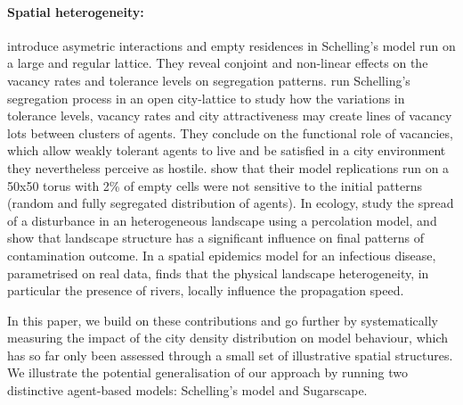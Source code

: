 \documentclass[3p,times,procedia]{elsarticle}
\begin{document}

\paragraph{Spatial heterogeneity:} \citet{StaufferSolomon2007} introduce asymetric interactions and empty residences in Schelling's model run on a large and regular lattice. They reveal conjoint and non-linear effects on the vacancy rates and tolerance levels on segregation patterns. \citet{Gauvinetal2010} run Schelling's segregation process in an open city-lattice to study how the variations in tolerance levels, vacancy rates and city attractiveness may create lines of vacancy lots between clusters of agents. They conclude on the functional role of vacancies, which allow weakly tolerant agents to live and be satisfied in a city environment they nevertheless perceive as hostile. \citet{HatnaBenenson2012} show that their model replications run on a 50x50 torus with 2\% of empty cells were not sensitive to the initial patterns (random and fully segregated distribution of agents). In ecology, \citet{smith2002predicting} study the spread of a disturbance in an heterogeneous landscape using a percolation model, and show that landscape structure has a significant influence on final patterns of contamination outcome. In a spatial epidemics model for an infectious disease, parametrised on real data, \citet{smith2002predicting} finds that the physical landscape heterogeneity, in particular the presence of rivers, locally influence the propagation speed.





In this paper, we build on these contributions and go further by systematically measuring the impact of the city density distribution on model behaviour, which has so far only been assessed through a small set of illustrative spatial structures. We illustrate the potential generalisation of our approach by running two distinctive agent-based models: Schelling's model and Sugarscape.
\end{document}
